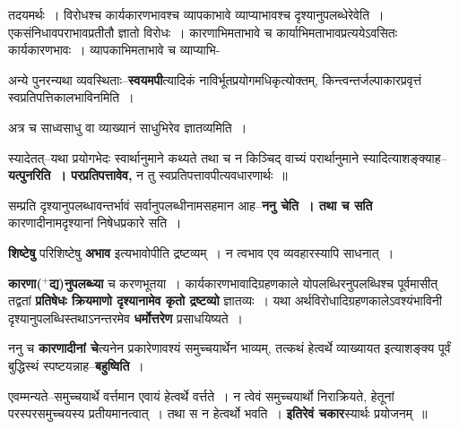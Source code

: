 \documentclass[article,12pt,a4paper]{memoir}
\newcommand{\add}[1]{($^{+}$#1)}
\begin{document}
	  \pstart तदयमर्थः । विरोधश्च कार्यकारणभावश्च व्यापकाभावे व्याप्याभावश्च दृश्यानुपलब्धेरेवेति । एकसंनिधावपराभावप्रतीतौ ज्ञातो विरोधः । कारणाभिमताभावे च कार्याभिमताभावप्रत्ययेऽवसितः कार्यकारणभावः । व्यापकाभिमताभावे च व्याप्याभि-
	\pend
      
	  \endgroup
	

	  \pstart अन्ये पुनरन्यथा व्यवस्थिताः--\textbf{स्वयमपी}त्यादिकं नाविर्भूतप्रयोगमधिकृत्योक्तम्, किन्त्वन्तर्जल्पाकारप्रवृत्तं स्वप्रतिपत्तिकालभा\leavevmode{}विनमिति ।
	\pend
      

	  \pstart अत्र च साध्वसाधु वा व्याख्यानं साधुभिरेव ज्ञातव्यमिति ।
	\pend
      

	  \pstart स्यादेतत्--यथा प्रयोगभेदः स्वार्थानुमाने कथ्यते तथा च न किञ्चिद् वाच्यं परार्थानुमाने स्यादित्याशङ्क्याह--\textbf{यत्पुनरिति । परप्रतिपत्तावेव,} न तु स्वप्रतिपत्तावपीत्यवधारणार्थः ॥
	\pend
      

	  \pstart सम्प्रति दृश्यानुपलब्धावन्तर्भावं सर्वानुपलब्धीनामसहमान आह--\textbf{ननु चेति । तथा च सति} कारणादीनामदृश्यानां निषेधप्रकारे सति ।
	\pend
      

	  \pstart \textbf{शिष्टेषु} परिशिष्टेषु \textbf{अभाव} इत्यभावोपीति द्रष्टव्यम् । न त्वभाव एव व्यवहारस्यापि साधनात् ।
	\pend
      

	  \pstart \textbf{कारणा\add{द्य}नुपलब्ध्या} च करणभूतया । कार्यकारणभावादिग्रहणकाले योपलब्धिरनुपलब्धिश्च पूर्वमासीत् तद्वतां \textbf{प्रतिषेधः क्रियमाणो दृश्यानामेव कृतो द्रष्टव्यो} ज्ञातव्यः । यथा अर्थविरोधादिग्रहणकालेऽवश्यंभाविनी दृश्यानुपलब्धिस्तथाऽनन्तरमेव \textbf{धर्मोत्तरेण} प्रसाधयिष्यते ।
	\pend
      

	  \pstart ननु च \textbf{कारणादीनां चे}त्यनेन प्रकारेणावश्यं समुच्चयार्थेन भाव्यम्, तत्कथं हेत्वर्थे व्याख्यायत इत्याशङ्क्य पूर्वं बुद्धिस्थं स्पष्टयन्नाह--\textbf{बहुष्विति} ।
	\pend
      

	  \pstart एवम्मन्यते--समुच्चयार्थे वर्त्तमान एवायं हेत्वर्थे वर्त्तते । न त्वेवं समुच्चयार्थो निराक्रियते, हेतूनां परस्परसमुच्चयस्य प्रतीयमानत्वात् । तथा स न हेत्वर्थो भवति । \textbf{इतिरेवं चकार}स्यार्थः प्रयोजनम् ॥
	\pend
	  \bigskip
	  \begingroup
	
\end{document}
